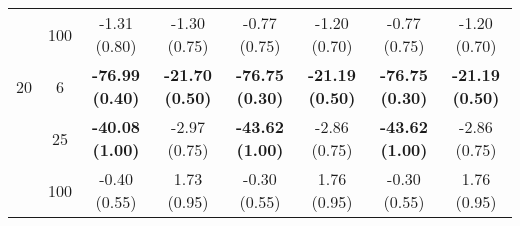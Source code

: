 \documentclass[
  man]{apa6}
\newenvironment{lltable}{\begin{landscape}\centering\begin{ThreePartTable}}{\end{ThreePartTable}\end{landscape}}
\begin{document}
\begin{lltable}
{\begin{longtable}{cccccccc}
 & 100 & -1.31 (0.80) & -1.30 (0.75) & -0.77 (0.75) & -1.20 (0.70) & -0.77 (0.75) & -1.20 (0.70)\\
20 & 6 & \textbf{-76.99 (0.40)} & \textbf{-21.70 (0.50)} & \textbf{-76.75 (0.30)} & \textbf{-21.19 (0.50)} & \textbf{-76.75 (0.30)} & \textbf{-21.19 (0.50)}\\
 & 25 & \textbf{-40.08 (1.00)} & -2.97 (0.75) & \textbf{-43.62 (1.00)} & -2.86 (0.75) & \textbf{-43.62 (1.00)} & -2.86 (0.75)\\
 & 100 & -0.40 (0.55) & 1.73 (0.95) & -0.30 (0.55) & 1.76 (0.95) & -0.30 (0.55) & 1.76 (0.95)\\
\bottomrule
\end{longtable}

}

\end{lltable}
\end{document}
